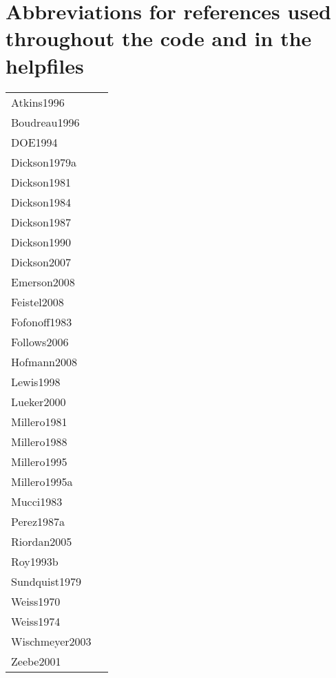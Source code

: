 \documentclass[article,nojss]{jss}
\begin{document}
\appendix

\section{Abbreviations for references used throughout the code and in the helpfiles}
\begin{tabular}{ll}
Atkins1996       & \cite{Atkins1996} \\
Boudreau1996     & \cite{Boudreau1996}\\
DOE1994          & \cite{DOE1994}\\
Dickson1979a     & \cite{Dickson1979a}\\
Dickson1981      & \cite{Dickson1981}\\
Dickson1984      & \cite{Dickson1984}\\
Dickson1987      & \cite{Dickson1987}\\
Dickson1990      & \cite{Dickson1990}\\
Dickson2007      & \cite{Dickson2007}\\
Emerson2008      & \cite{Emerson2008}\\
Feistel2008      & \cite{Feistel2008}\\
Fofonoff1983     & \cite{Fofonoff1983}\\
Follows2006      & \cite{Follows2006}\\
Hofmann2008      & \cite{Hofmann2008}\\
Lewis1998        & \cite{Lewis1998}\\
Lueker2000       & \cite{Lueker2000}\\
Millero1981      & \cite{Millero1981}\\
Millero1988      & \cite{Millero1988}\\
Millero1995      & \cite{Millero1995}\\
Millero1995a     & \cite{Millero1995a}\\
Mucci1983        & \cite{Mucci1983}\\
Perez1987a       & \cite{Perez1987a}\\
Riordan2005      & \cite{Riordan2005}\\
Roy1993b         & \cite{Roy1993b}\\
Sundquist1979    & \cite{Sundquist1979}\\
Weiss1970        & \cite{Weiss1970}\\
Weiss1974        & \cite{Weiss1974}\\
Wischmeyer2003   & \cite{Wischmeyer2003}\\
Zeebe2001        & \cite{Zeebe2001}\\
\end{tabular}
\end{document}
